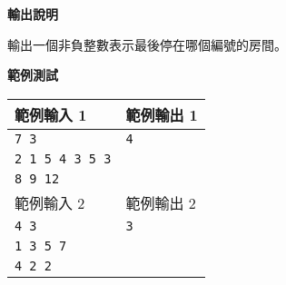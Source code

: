     \textbf{輸出說明}

    輸出一個非負整數表示最後停在哪個編號的房間。

    \textbf{範例測試}

    \begin{tabular}{|m{7cm}|m{7cm}|}
        \hline
        範例輸入 1 & 範例輸出 1 \\
        \hline
        \verb|7 3| &  \verb|4| \\
        \verb|2 1 5 4 3 5 3| & \\
        \verb|8 9 12| & \\
        \hline
        範例輸入 2 & 範例輸出 2 \\
        \hline
        \verb|4 3| &  \verb|3| \\
        \verb|1 3 5 7| & \\
        \verb|4 2 2| & \\
        \hline
    \end{tabular}